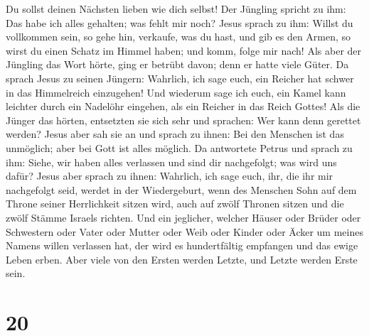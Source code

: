 Du sollst deinen Nächsten lieben wie dich selbst!  Der
Jüngling spricht zu ihm: Das habe ich alles gehalten; was fehlt mir
noch?  Jesus sprach zu ihm: Willst du vollkommen sein, so
gehe hin, verkaufe, was du hast, und gib es den Armen, so wirst du einen
Schatz im Himmel haben; und komm, folge mir nach!  Als
aber der Jüngling das Wort hörte, ging er betrübt davon; denn er hatte
viele Güter.  Da sprach Jesus zu seinen Jüngern:
Wahrlich, ich sage euch, ein Reicher hat schwer in das Himmelreich
einzugehen!  Und wiederum sage ich euch, ein Kamel kann
leichter durch ein Nadelöhr eingehen, als ein Reicher in das Reich
Gottes!  Als die Jünger das hörten, entsetzten sie sich
sehr und sprachen: Wer kann denn gerettet werden?  Jesus
aber sah sie an und sprach zu ihnen: Bei den Menschen ist das unmöglich;
aber bei Gott ist alles möglich.  Da antwortete Petrus
und sprach zu ihm: Siehe, wir haben alles verlassen und sind dir
nachgefolgt; was wird uns dafür?  Jesus aber sprach zu
ihnen: Wahrlich, ich sage euch, ihr, die ihr mir nachgefolgt seid,
werdet in der Wiedergeburt, wenn des Menschen Sohn auf dem Throne seiner
Herrlichkeit sitzen wird, auch auf zwölf Thronen sitzen und die zwölf
Stämme Israels richten.  Und ein jeglicher, welcher
Häuser oder Brüder oder Schwestern oder Vater oder Mutter oder Weib oder
Kinder oder Äcker um meines Namens willen verlassen hat, der wird es
hundertfältig empfangen und das ewige Leben erben.  Aber
viele von den Ersten werden Letzte, und Letzte werden Erste sein.

\hypertarget{section-19}{%
\section{20}\label{section-19}}


